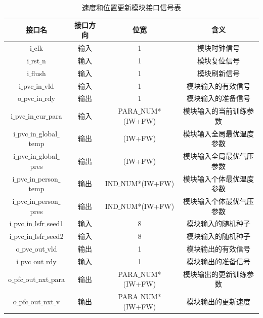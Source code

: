 \begin{table}[H]
    \centering
    \caption{速度和位置更新模块接口信号表}
    \label{tab:速度和位置更新模块接口信号表}
\begin{tabular}{c|c|c|c}
    \hline
    接口名                                          & 接口方向  & 位宽               &含义                        \\ \hline
    i$\_$clk                                       & 输入      & 1                     & 模块时钟信号             \\ \hline
    i$\_$rst$\_$n                                  & 输入      & 1                     & 模块复位信号             \\ \hline
    i$\_$flush                                     & 输入      & 1                     & 模块刷新信号             \\ \hline
    i$\_$pvc$\_$in$\_$vld                          & 输入      & 1                     & 模块输入的有效信号        \\ \hline
    o$\_$pvc$\_$in$\_$rdy                          & 输出      & 1                     & 模块输入的准备信号        \\ \hline
    i$\_$pvc$\_$in$\_$cur$\_$para                  & 输入      & PARA$\_$NUM*(IW+FW)   & 模块输入的当前训练参数         \\ \hline
    i$\_$pvc$\_$in$\_$global$\_$temp               & 输出      & (IW+FW)               & 模块输入全局最优温度参数        \\ \hline
    i$\_$pvc$\_$in$\_$global$\_$pres               & 输出      & (IW+FW)               & 模块输入全局最优气压参数        \\ \hline
    i$\_$pvc$\_$in$\_$person$\_$temp               & 输出      & IND$\_$NUM*(IW+FW)    & 模块输入个体最优温度参数        \\ \hline
    i$\_$pvc$\_$in$\_$person$\_$pres               & 输出      & IND$\_$NUM*(IW+FW)    & 模块输入个体最优气压参数        \\ \hline
    i$\_$pvc$\_$in$\_$lsfr$\_$seed1                & 输入      & 8                     & 模块输入的随机种子              \\ \hline
    i$\_$pvc$\_$in$\_$lsfr$\_$seed2                & 输入      & 8                     & 模块输入的随机种子              \\ \hline


    o$\_$pvc$\_$out$\_$vld                         & 输出      & 1                     & 模块输出的有效信号        \\ \hline
    i$\_$pvc$\_$out$\_$rdy                         & 输入      & 1                     & 模块输出的准备信号        \\ \hline
    o$\_$pfc$\_$out$\_$nxt$\_$para                 & 输出      & PARA$\_$NUM*(IW+FW)   & 模块输出的更新训练参数     \\ \hline
    o$\_$pfc$\_$out$\_$nxt$\_$v                    & 输出      & PARA$\_$NUM*(IW+FW)   & 模块输出的更新速度         \\ \hline

\end{tabular}
\end{table}


